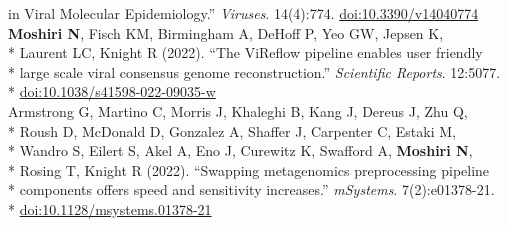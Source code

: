 \documentclass[margin,line]{res}
\begin{document}
\begin{resume}
\hspace*{8mm} in Viral Molecular Epidemiology.'' \textit{Viruses}. 14(4):774. \href{https://doi.org/10.3390/v14040774}{doi:10.3390/v14040774}\\
\hspace*{4mm} \textbf{Moshiri N}, Fisch KM, Birmingham A, DeHoff P, Yeo GW, Jepsen K,\\*
\hspace*{9.5mm} Laurent LC, Knight R (2022). ``The ViReflow pipeline enables user friendly\\*
\hspace*{9.5mm} large scale viral consensus genome reconstruction.'' \textit{Scientific Reports}. 12:5077.\\*\vspace{2mm}
\hspace*{8mm} \href{https://doi.org/10.1038/s41598-022-09035-w}{doi:10.1038/s41598-022-09035-w}\\
\hspace*{4mm} Armstrong G, Martino C, Morris J, Khaleghi B, Kang J, Dereus J, Zhu Q,\\*
\hspace*{9.5mm} Roush D, McDonald D, Gonzalez A, Shaffer J, Carpenter C, Estaki M,\\*
\hspace*{9.5mm} Wandro S, Eilert S, Akel A, Eno J, Curewitz K, Swafford A, \textbf{Moshiri N},\\*
\hspace*{9.5mm} Rosing T, Knight R (2022). ``Swapping metagenomics preprocessing pipeline\\*
\hspace*{9.5mm} components offers speed and sensitivity increases.'' \textit{mSystems}. 7(2):e01378-21.\\*\vspace{2mm}
\hspace*{8mm} \href{https://doi.org/10.1128/msystems.01378-21}{doi:10.1128/msystems.01378-21}\\

\end{resume}
\end{document}

